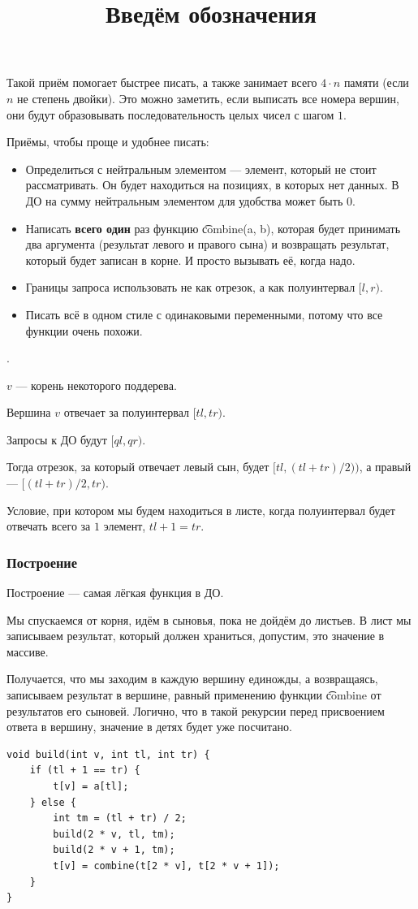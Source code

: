 Такой приём помогает быстрее писать, а также занимает всего $4 \cdot n$ памяти (если $n$ не степень двойки). Это можно заметить, если выписать все номера вершин, они будут образовывать последовательность целых чисел с шагом $1$.

Приёмы, чтобы проще и удобнее писать:

\up \up
\begin{itemize}
	\item Определиться с нейтральным элементом --- элемент, который не стоит рассматривать. Он будет находиться на позициях, в которых нет данных. В ДО на сумму нейтральным элементом для удобства может быть $0$.
	\item Написать {\bf всего один} раз функцию \t{combine(a, b)}, которая будет принимать два аргумента (результат левого и правого сына) и возвращать результат, который будет записан в корне. И просто вызывать её, когда надо.
	\item Границы запроса использовать не как отрезок, а как полуинтервал $[l, r)$.
	\item Писать всё в одном стиле с одинаковыми переменными, потому что все функции очень похожи.
\end{itemize} \up \up

\title{Введём обозначения}.

$v$ --- корень некоторого поддерева.

Вершина $v$ отвечает за полуинтервал $[tl, tr)$.

Запросы к ДО будут $[ql, qr)$.

Тогда отрезок, за который отвечает левый сын, будет $[tl, (tl + tr) / 2))$, а правый --- $[(tl + tr) / 2, tr)$.

Условие, при котором мы будем находиться в листе, когда полуинтервал будет отвечать всего за $1$ элемент, $tl + 1 = tr$.


\pagebreak

\subsubsection{Построение}

Построение --- самая лёгкая функция в ДО. 

Мы спускаемся от корня, идём в сыновья, пока не дойдём до листьев. В лист мы записываем результат, который должен храниться, допустим, это значение в массиве.

Получается, что мы заходим в каждую вершину единожды, а возвращаясь, записываем результат в вершине, равный применению функции \t{combine} от результатов его сыновей. Логично, что в такой рекурсии перед присвоением ответа в вершину, значение в детях будет уже посчитано.
\up \up
\begin{verbatim}
void build(int v, int tl, int tr) {
	if (tl + 1 == tr) {
		t[v] = a[tl];
	} else {
		int tm = (tl + tr) / 2;
		build(2 * v, tl, tm);
		build(2 * v + 1, tm);
		t[v] = combine(t[2 * v], t[2 * v + 1]);
	}
}
\end{verbatim}
\up \up

